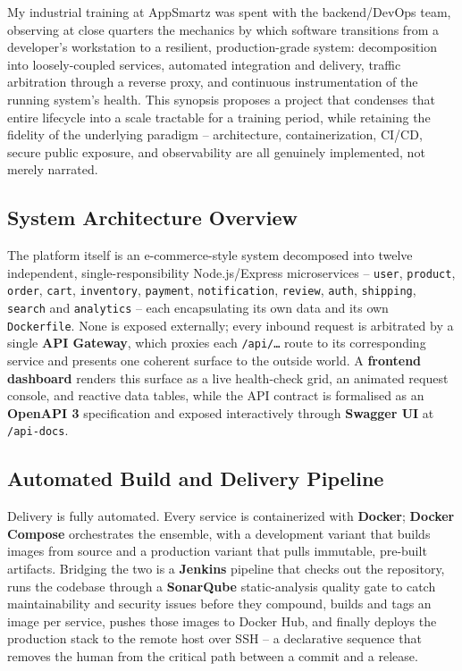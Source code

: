 \documentclass[12pt,a4paper]{article}
\begin{document}
My industrial training at AppSmartz was spent with the backend/DevOps team,
observing at close quarters the mechanics by which software transitions from a
developer's workstation to a resilient, production-grade system: decomposition
into loosely-coupled services, automated integration and delivery, traffic
arbitration through a reverse proxy, and continuous instrumentation of the
running system's health. This synopsis proposes a project that condenses that
entire lifecycle into a scale tractable for a training period, while retaining
the fidelity of the underlying paradigm -- architecture, containerization,
CI/CD, secure public exposure, and observability are all genuinely implemented,
not merely narrated.

\subsection{System Architecture Overview}

The platform itself is an e-commerce-style system decomposed into twelve
independent, single-responsibility Node.js/Express microservices --
\texttt{user}, \texttt{product}, \texttt{order}, \texttt{cart},
\texttt{inventory}, \texttt{payment}, \texttt{notification}, \texttt{review},
\texttt{auth}, \texttt{shipping}, \texttt{search} and \texttt{analytics} --
each encapsulating its own data and its own \texttt{Dockerfile}. None is
exposed externally; every inbound request is arbitrated by a single
\textbf{API Gateway}, which proxies each \texttt{/api/\ldots} route to its
corresponding service and presents one coherent surface to the outside world.
A \textbf{frontend dashboard} renders this surface as a live health-check
grid, an animated request console, and reactive data tables, while the API
contract is formalised as an \textbf{OpenAPI 3} specification and exposed
interactively through \textbf{Swagger UI} at \texttt{/api-docs}.

\subsection{Automated Build and Delivery Pipeline}

Delivery is fully automated. Every service is containerized with
\textbf{Docker}; \textbf{Docker Compose} orchestrates the ensemble, with a
development variant that builds images from source and a production variant
that pulls immutable, pre-built artifacts. Bridging the two is a
\textbf{Jenkins} pipeline that checks out the repository, runs the codebase
through a \textbf{SonarQube} static-analysis quality gate to catch
maintainability and security issues before they compound, builds and tags an
image per service, pushes those images to Docker Hub, and finally deploys the
production stack to the remote host over SSH -- a declarative sequence that
removes the human from the critical path between a commit and a release.
\end{document}
